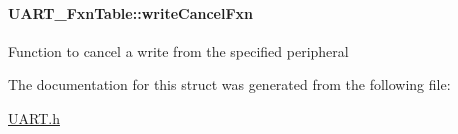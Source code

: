 \paragraph[{write\+Cancel\+Fxn}]{ U\+A\+R\+T\+\_\+\+Fxn\+Table\+::write\+Cancel\+Fxn}\label{struct_u_a_r_t___fxn_table_a5eb722a7231589656f26cb1e8b06095e}
Function to cancel a write from the specified peripheral 

The documentation for this struct was generated from the following file\+:\begin{DoxyCompactItemize}
\item 
\hyperlink{_u_a_r_t_8h}{U\+A\+R\+T.\+h}\end{DoxyCompactItemize}
